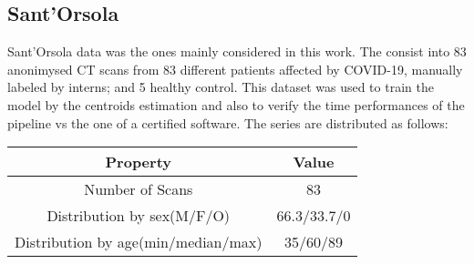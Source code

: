 \documentclass{standalone}
\begin{document}
	\subsection{Sant'Orsola}
	
	Sant'Orsola data was the ones mainly considered in this work. The consist into 83 anonimysed CT scans from $83$ different patients affected by COVID-19, manually labeled by interns; and 5 healthy control. This dataset was used to train the model by the centroids estimation and also to verify the time performances of the pipeline vs the one of a certified software.  
	The series are distributed as follows: 
	\begin{table}[h!]
		\centering
		\begin{tabular}{|c|c|}
			\hline
					\textbf{Property}   		&	\textbf{Value} \\ \hline
					Number of Scans 			& 83			   \\ 
			Distribution by sex(M/F/O)  		& 66.3/33.7/0    \\
			Distribution by age(min/median/max) & 35/60/89	\\ \hline
		\end{tabular}
	\end{table}

	
\end{document}
